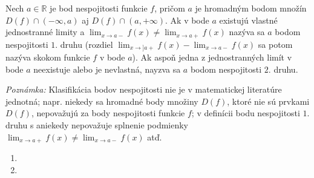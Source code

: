 Nech $a \in \mathbb{R}$ je bod nespojitosti funkcie $f$, pričom $a$ je hromadným bodom množín $D(f) \cap (-\infty,a)$ aj $D(f)\cap (a,+\infty)$. Ak v bode $a$ existujú vlastné jednostranné limity a $\lim_{x \rightarrow a-}f(x) \neq \lim_{x \rightarrow a+}f(x)$ nazýva sa $a$ bodom nespojitosti $1.$ druhu (rozdiel $\lim_{x \rightarrow] a+}f(x)-\lim_{x \rightarrow a-}f(x)$ sa potom nazýva skokom funkcie $f$ v bode $a$). Ak aspoň jedna z jednostranných limít v bode $a$ neexistuje alebo je nevlastná, nayzva sa $a$ bodom nespojitosti $2.$ druhu.

\textit{Poznámka:}
Klasifikácia bodov nespojitosti nie je v matematickej literatúre jednotná; napr. niekedy sa hromadné body množiny $D(f)$, ktoré nie sú prvkami $D(f)$, nepovažujú za body nespojitosti funkcie $f$; v definícii bodu nespojitosti $1.$ druhu s aniekedy nepovažuje splnenie podmienky $\lim_{x \rightarrow a+}f(x) \neq \lim_{x \rightarrow a-}f(x)$ atď.

\begin{enumerate}[resume]
	\item {}
	\item {}
\end{enumerate}
